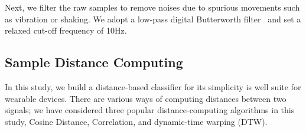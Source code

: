 Next, we filter the raw samples to remove noises due to spurious movements such as vibration or shaking.
We adopt a low-pass digital Butterworth
filter~\cite{challis1983design} and set a relaxed cut-off frequency of 10Hz.


\subsection{Sample Distance Computing}


In this study, we build a distance-based classifier for its simplicity is well suite for wearable devices. There are various ways of computing distances between two signals; we have considered three popular distance-computing algorithms in this study, Cosine Distance, Correlation, and dynamic-time warping (DTW).

